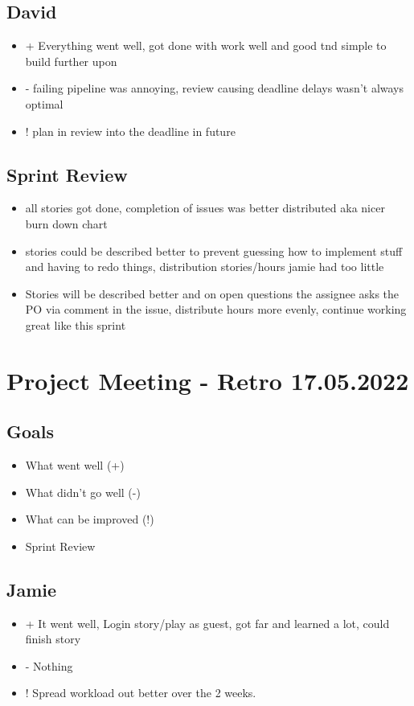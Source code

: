 \subsection{David}
\begin{itemize}
    \item + Everything went well, got done with work well and good tnd simple to build further upon
    \item - failing pipeline was annoying, review causing deadline delays wasn't always optimal
    \item ! plan in review into the deadline in future
\end{itemize}

\subsection{Sprint Review}
\begin{itemize}
    \item all stories got done, completion of issues was better distributed aka nicer burn down chart
    \item stories could be described better to prevent guessing how to implement stuff and having to redo things, distribution stories/hours jamie had too little
    \item Stories will be described better and on open questions the assignee asks the PO via comment in the issue, distribute hours more evenly, continue working great like this sprint
\end{itemize}

\section{Project Meeting - Retro 17.05.2022}

\subsection{Goals}
\begin{itemize}
    \item What went well (+)
    \item What didn't go well (-)
    \item What can be improved (!)
    \item Sprint Review
\end{itemize}

\subsection{Jamie}
\begin{itemize}
    \item + It went well, Login story/play as guest, got far and learned a lot, could finish story
    \item - Nothing
    \item ! Spread workload out better over the 2 weeks.
\end{itemize}

